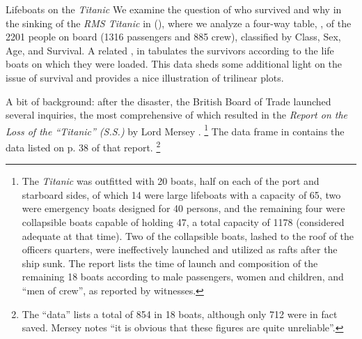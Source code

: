 \documentclass[11pt]{book}\usepackage[]{graphicx}\usepackage[]{color}
\begin{document}
\begin{Example}[lifeboat1]{Lifeboats on the \emph{Titanic}}
We examine the question of who survived and why in the sinking of the \emph{RMS Titanic} in  (),
where we analyze a four-way table, ,
of the 2201 people on board (1316 passengers and 885 crew),
classified by Class, Sex, Age, and Survival.
A related \Dset,  in  tabulates
the survivors according to the life boats on which they were loaded.
This data sheds some additional light on the issue of survival and
provides a nice illustration of trilinear plots.

A bit of background: after the disaster, the British Board of Trade launched several
inquiries, the most comprehensive of which resulted in the
\emph{Report on the Loss of the ``Titanic'' (S.S.)}
by Lord Mersey
\citep{Mersey:1912}.
\footnote{
The \emph{Titanic} was outfitted with 20 boats, half on each of the
port and starboard sides,
 of which 14 were large
lifeboats with a capacity of 65, two were emergency boats designed for
40 persons, and the remaining four were collapsible boats capable of holding
47, a total capacity of 1178 (considered adequate at that time).
Two of the collapsible boats, lashed to the roof of the officers
quarters, were ineffectively launched and utilized as rafts after the ship sunk.
The report lists the time of launch and composition of the remaining 18 boats according to male passengers, women and children, and ``men of crew'',
as reported by witnesses.
}
The  data frame   in 
contains the data listed on p. 38 of that report.%
\footnote{The ``data'' lists a total of 854 in 18 boats, although only
712 were in fact saved.  Mersey notes ``it is obvious that these figures
are quite unreliable''.  
}


\end{Example}
\end{document}
